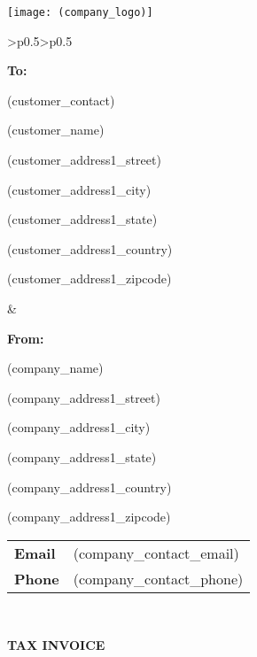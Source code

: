 \documentclass[english]{article}
\providecommand{\tabularnewline}{\\}
\begin{document}
\noindent \texttt{[image: (company\_logo)]}
		

\noindent \begin{tabular}{>{\centering}p{}>{\centering}p{}}
\noindent \begin{flushleft}
\textbf{To:}

(customer\_contact)

(customer\_name)


(customer\_address1\_street)

(customer\_address1\_city)

(customer\_address1\_state)

(customer\_address1\_country)

(customer\_address1\_zipcode)

\par\end{flushleft}
& \begin{flushleft}
\textbf{From:}

(company\_name)

(company\_address1\_street)

(company\_address1\_city)

(company\_address1\_state)

(company\_address1\_country)

(company\_address1\_zipcode)

\vspace{5mm}

\begin{tabular}{ll}
\textbf{Email} & (company\_contact\_email) \tabularnewline
\textbf{Phone} & (company\_contact\_phone) \tabularnewline
\end{tabular}

\par\end{flushleft}
\tabularnewline
\end{tabular}

\noindent \vspace{10mm}


\noindent \textbf{TAX INVOICE}

\vspace{5mm}
\noindent \begin{tabular}{ll}
\end{tabular}
 
\end{document}
